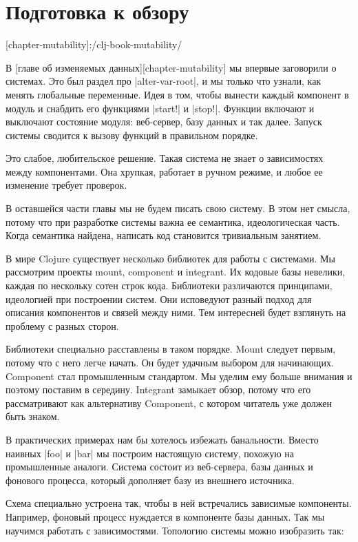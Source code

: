 \section{Подготовка к обзору}

[chapter-mutability]:/clj-book-mutability/

В [главе об изменяемых данных][chapter-mutability] мы впервые заговорили о
системах. Это был раздел про \spverb|alter-var-root|, и мы только что узнали, как
менять глобальные переменные. Идея в том, чтобы вынести каждый компонент в
модуль и снабдить его функциями \spverb|start!| и \spverb|stop!|. Функции включают и выключают
состояние модуля: веб-сервер, базу данных и так далее. Запуск системы сводится к
вызову функций в правильном порядке.

Это слабое, любительское решение. Такая система не знает о зависимостях между
компонентами. Она хрупкая, работает в ручном режиме, и любое ее изменение
требует проверок.

В оставшейся части главы мы не будем писать свою систему. В этом нет смысла,
потому что при разработке системы важна ее семантика, идеологическая
часть. Когда семантика найдена, написать код становится тривиальным занятием.

В мире Clojure существует несколько библиотек для работы с системами. Мы
рассмотрим проекты mount, component и integrant. Их кодовые базы невелики,
каждая по нескольку сотен строк кода. Библиотеки различаются принципами,
идеологией при построении систем. Они исповедуют разный подход для описания
компонентов и связей между ними. Тем интересней будет взглянуть на проблему с
разных сторон.

Библиотеки специально расставлены в таком порядке. Mount следует первым, потому
что с него легче начать. Он будет удачным выбором для начинающих. Component стал
промышленным стандартом. Мы уделим ему больше внимания и поэтому поставим в
середину. Integrant замыкает обзор, потому что его рассматривают как
альтернативу Component, с котором читатель уже должен быть знаком.

В практических примерах нам бы хотелось избежать банальности. Вместо наивных
\spverb|foo| и \spverb|bar| мы построим настоящую систему, похожую на промышленные
аналоги. Система состоит из веб-сервера, базы данных и фонового процесса,
который дополняет базу из внешнего источника.

Схема специально устроена так, чтобы в ней встречались зависимые
компоненты. Например, фоновый процесс нуждается в компоненте базы данных. Так мы
научимся работать с зависимостями. Топологию системы можно изобразить так:

